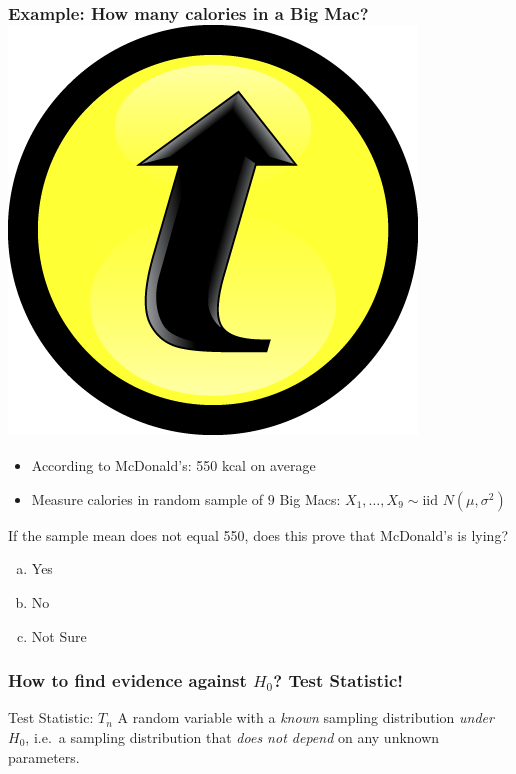 \documentclass[handout]{beamer}
\begin{document}
\begin{frame}[t]
	\frametitle{Example: How many calories in a Big Mac? \hfill \includegraphics[scale = 0.05]{./images/clicker}}
\begin{itemize}
	\item According to McDonald's: 550 kcal on average
	\item Measure calories in random sample of $9$ Big Macs: $X_1, \hdots, X_{9} \sim \mbox{iid } N(\mu, \sigma^2)$
\end{itemize}

\vspace{1em}

\alert{If the sample mean does not equal 550, does this prove that McDonald's is lying?}
\begin{enumerate}[(a)]
	\item Yes
	\item No
	\item Not Sure
\end{enumerate}
\end{frame}
\begin{frame}
	\frametitle{How to find evidence against $H_0$? Test Statistic!}
	\begin{block}
		{Test Statistic: $T_n$}
		A random variable with a \emph{known} sampling distribution \emph{under $H_0$}, i.e.\ a sampling distribution that \emph{does not depend} on any unknown parameters.
	\end{block}
\end{frame}
\end{document}
